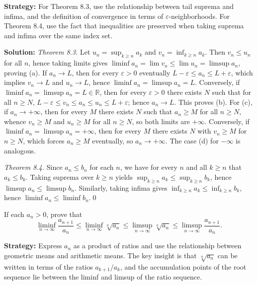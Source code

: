 \noindent\textbf{Strategy:} For Theorem 8.3, use the relationship between tail suprema and infima, and the definition of convergence in terms of \(\varepsilon\)-neighborhoods. For Theorem 8.4, use the fact that inequalities are preserved when taking suprema and infima over the same index set.


\bigskip\noindent\textbf{Solution:}
\emph{Theorem 8.3.} Let \(u_n=\sup_{k\ge n} a_k\) and \(v_n=\inf_{k\ge n} a_k\). Then \(v_n\le u_n\) for all \(n\), hence taking limits gives \(\liminf a_n=\lim v_n\le \lim u_n=\limsup a_n\), proving (a). If \(a_n\to L\), then for every \(\varepsilon>0\) eventually \(L-\varepsilon\le a_n\le L+\varepsilon\), which implies \(v_n\to L\) and \(u_n\to L\), hence \(\liminf a_n=\limsup a_n=L\). Conversely, if \(\liminf a_n=\limsup a_n=L\in\mathbb{R}\), then for every \(\varepsilon>0\) there exists \(N\) such that for all \(n\ge N\), \(L-\varepsilon\le v_n\le a_n\le u_n\le L+\varepsilon\); hence \(a_n\to L\). This proves (b). For (c), if \(a_n\to +\infty\), then for every \(M\) there exists \(N\) such that \(a_n\ge M\) for all \(n\ge N\), whence \(v_n\ge M\) and \(u_n\ge M\) for all \(n\ge N\), so both limits are \(+\infty\). Conversely, if \(\liminf a_n=\limsup a_n=+\infty\), then for every \(M\) there exists \(N\) with \(v_n\ge M\) for \(n\ge N\), which forces \(a_n\ge M\) eventually, so \(a_n\to +\infty\). The case (d) for \(-\infty\) is analogous.

\emph{Theorem 8.4.} Since \(a_n\le b_n\) for each \(n\), we have for every \(n\) and all \(k\ge n\) that \(a_k\le b_k\). Taking suprema over \(k\ge n\) yields \(\sup_{k\ge n} a_k\le \sup_{k\ge n} b_k\), hence \(\limsup a_n\le \limsup b_n\). Similarly, taking infima gives \(\inf_{k\ge n} a_k\le \inf_{k\ge n} b_k\), hence \(\liminf a_n\le \liminf b_n\).\qed


\begin{problembox}
\begin{problemstatement}
If each \(a_n > 0\), prove that
\[\liminf_{n \to \infty} \frac{a_{n+1}}{a_n} \leq \liminf_{n \to \infty} \sqrt[n]{a_n} \leq \limsup_{n \to \infty} \sqrt[n]{a_n} \leq \limsup_{n \to \infty} \frac{a_{n+1}}{a_n}.\]
\end{problemstatement}
\end{problembox}

\noindent\textbf{Strategy:} Express \(a_n\) as a product of ratios and use the relationship between geometric means and arithmetic means. The key insight is that \(\sqrt[n]{a_n}\) can be written in terms of the ratios \(a_{k+1}/a_k\), and the accumulation points of the root sequence lie between the liminf and limsup of the ratio sequence.

